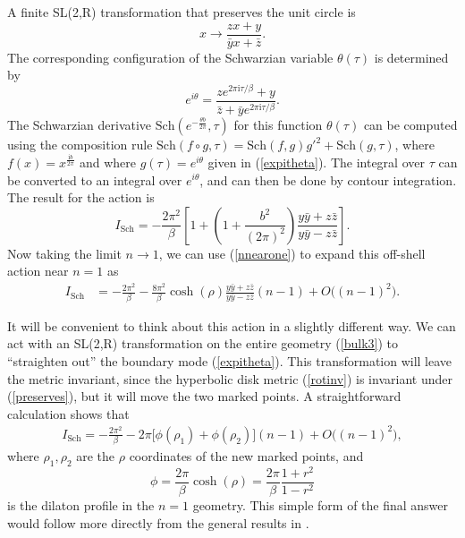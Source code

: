 \documentclass[11pt]{article}
\newcommand{\be}{\begin{equation}}
\newcommand{\ee}{\end{equation}}
\numberwithin{equation}{section}
\begin{document}
A finite SL(2,R) transformation that preserves the unit circle is
\be\label{preserves}
x \rightarrow \frac{zx  +y}{\bar{y}x + \bar{z}}.
\ee
The corresponding configuration of the Schwarzian variable $\theta(\tau)$ is determined by
\be
e^{i\theta} = \frac{z e^{2\pi \mathrm{i}\tau/\beta} + y}{\bar{z} + \bar{y}e^{2\pi \mathrm{i}\tau/\beta}}.\label{expitheta}
\ee
The Schwarzian derivative $\text{Sch}(e^{-\frac{\theta b}{2\pi}},\tau)$ for this function $\theta(\tau)$ can be computed using the composition rule $\text{Sch}(f\circ g,\tau) = \text{Sch}(f,g)g'^2 + \text{Sch}(g,\tau)$, where $f(x) = x^{\frac{\mathrm{i}b}{2\pi}}$ and where $g(\tau) = e^{i\theta}$ given in (\ref{expitheta}). The integral over $\tau$ can be converted to an integral over $e^{i\theta}$, and can then be done by contour integration. The result for the action is
\be
I_{\text{Sch}} = -\frac{2\pi^2}{\beta}\left[1 + \left(1 + \frac{b^2}{(2\pi)^2}\right)\frac{y \bar{y} + z\bar{z}}{y\bar{y} - z\bar{z}}\right].\label{schactio}
\ee
Now taking the limit $n\rightarrow 1$, we can use (\ref{nnearone}) to expand this off-shell action near $n = 1$ as
\begin{align}
I_{\text{Sch}} &= -\frac{2\pi^2}{\beta} -\frac{8\pi^2}{\beta}\cosh(\rho)\frac{y \bar{y} + z\bar{z}}{y\bar{y} - z\bar{z}}(n-1) + O\big((n{-}1)^2\big).
\end{align}

It will be convenient to think about this action in a slightly different way. We can act with an SL(2,R) transformation on the entire geometry (\ref{bulk3}) to ``straighten out'' the boundary mode (\ref{expitheta}). This transformation will leave the metric invariant, since the hyperbolic disk metric (\ref{rotinv}) is invariant under (\ref{preserves}), but it will move the two marked points. A straightforward calculation shows that
\begin{align}
I_{\text{Sch}}=-\frac{2\pi^2}{\beta} - 2\pi \big[\phi(\rho_1) +\phi(\rho_2)\big](n-1)+ O\big((n{-}1)^2\big),\label{offshell}
\end{align}
where $\rho_1,\rho_2$ are the $\rho$ coordinates of the new marked points, and 
\be
\phi = \frac{2\pi}{\beta}\cosh(\rho) = \frac{2\pi}{\beta}\frac{1+r^2}{1-r^2}
\ee
is the dilaton profile in the $n = 1$ geometry. This simple form of the final answer would follow more directly from the general results in \cite{Lewkowycz:2013nqa,Dong:2017xht}.
\end{document}
